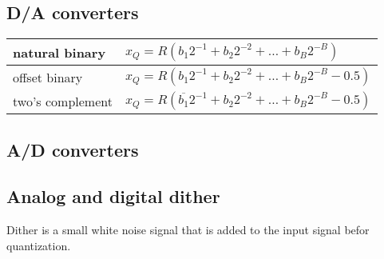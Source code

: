 \subsection{D/A converters}
\begin{tabular}{|l|l|}
	\hline
	natural binary & $x_Q = R(b_1 2^{-1} + b_2 2^{-2} + \ldots + b_B 2^{-B})$
	\\ \hline
	offset binary	& $x_Q = R(b_1 2^{-1} + b_2 2^{-2} + \ldots + b_B 2^{-B} - 0.5)$
	\\ \hline
	two's complement & $x_Q = R(\overline{b_1} 2^{-1} + b_2 2^{-2} + \ldots + b_B 2^{-B} - 0.5)$
	\\ \hline
\end{tabular}


\subsection{A/D converters}
\subsection{Analog and digital dither}
Dither is a small white noise signal that is added to the input signal befor quantization.